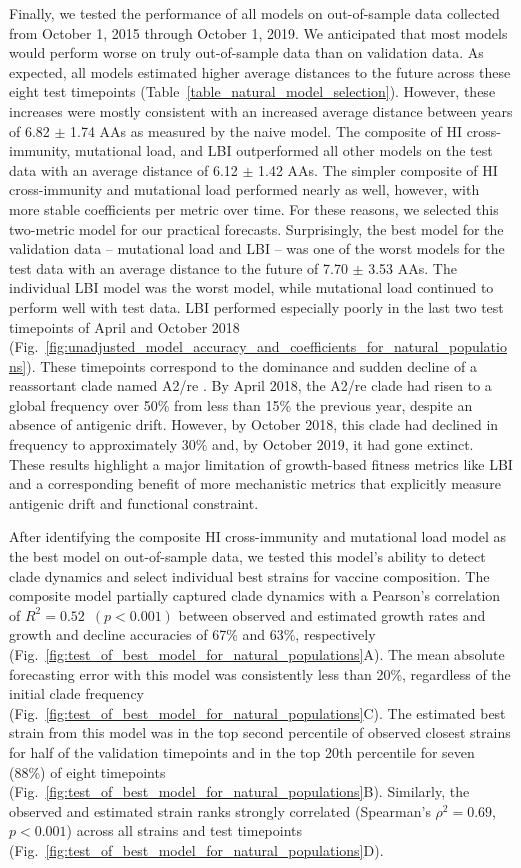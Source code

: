 Finally, we tested the performance of all models on out-of-sample data collected from October 1, 2015 through October 1, 2019.
We anticipated that most models would perform worse on truly out-of-sample data than on validation data.
As expected, all models estimated higher average distances to the future across these eight test timepoints (Table~\ref{table_natural_model_selection}).
However, these increases were mostly consistent with an increased average distance between years of 6.82 $\pm$ 1.74 AAs as measured by the naive model.
The composite of HI cross-immunity, mutational load, and LBI outperformed all other models on the test data with an average distance of 6.12 $\pm$ 1.42 AAs.
The simpler composite of HI cross-immunity and mutational load performed nearly as well, however, with more stable coefficients per metric over time.
For these reasons, we selected this two-metric model for our practical forecasts.
Surprisingly, the best model for the validation data -- mutational load and LBI -- was one of the worst models for the test data with an average distance to the future of 7.70 $\pm$ 3.53 AAs.
The individual LBI model was the worst model, while mutational load continued to perform well with test data.
LBI performed especially poorly in the last two test timepoints of April and October 2018 (Fig.~\ref{fig:unadjusted_model_accuracy_and_coefficients_for_natural_populations}).
These timepoints correspond to the dominance and sudden decline of a reassortant clade named A2/re \cite{Potter2019}.
By April 2018, the A2/re clade had risen to a global frequency over 50\% from less than 15\% the previous year, despite an absence of antigenic drift.
However, by October 2018, this clade had declined in frequency to approximately 30\% and, by October 2019, it had gone extinct.
These results highlight a major limitation of growth-based fitness metrics like LBI and a corresponding benefit of more mechanistic metrics that explicitly measure antigenic drift and functional constraint.

After identifying the composite HI cross-immunity and mutational load model as the best model on out-of-sample data, we tested this model's ability to detect clade dynamics and select individual best strains for vaccine composition.
The composite model partially captured clade dynamics with a Pearson's correlation of $R^2 = 0.52$~$(p < 0.001)$ between observed and estimated growth rates and growth and decline accuracies of 67\% and 63\%, respectively (Fig.~\ref{fig:test_of_best_model_for_natural_populations}A).
The mean absolute forecasting error with this model was consistently less than 20\%, regardless of the initial clade frequency (Fig.~\ref{fig:test_of_best_model_for_natural_populations}C).
The estimated best strain from this model was in the top second percentile of observed closest strains for half of the validation timepoints and in the top 20th percentile for seven (88\%) of eight timepoints (Fig.~\ref{fig:test_of_best_model_for_natural_populations}B).
Similarly, the observed and estimated strain ranks strongly correlated (Spearman's $\rho^2 = 0.69$, $p < 0.001$) across all strains and test timepoints (Fig.~\ref{fig:test_of_best_model_for_natural_populations}D).

